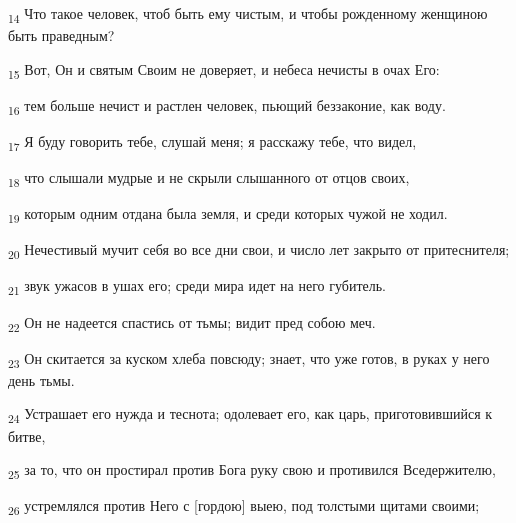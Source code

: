 \begin{tcolorbox}
\textsubscript{14} Что такое человек, чтоб быть ему чистым, и чтобы рожденному женщиною быть праведным?
\end{tcolorbox}
\begin{tcolorbox}
\textsubscript{15} Вот, Он и святым Своим не доверяет, и небеса нечисты в очах Его:
\end{tcolorbox}
\begin{tcolorbox}
\textsubscript{16} тем больше нечист и растлен человек, пьющий беззаконие, как воду.
\end{tcolorbox}
\begin{tcolorbox}
\textsubscript{17} Я буду говорить тебе, слушай меня; я расскажу тебе, что видел,
\end{tcolorbox}
\begin{tcolorbox}
\textsubscript{18} что слышали мудрые и не скрыли слышанного от отцов своих,
\end{tcolorbox}
\begin{tcolorbox}
\textsubscript{19} которым одним отдана была земля, и среди которых чужой не ходил.
\end{tcolorbox}
\begin{tcolorbox}
\textsubscript{20} Нечестивый мучит себя во все дни свои, и число лет закрыто от притеснителя;
\end{tcolorbox}
\begin{tcolorbox}
\textsubscript{21} звук ужасов в ушах его; среди мира идет на него губитель.
\end{tcolorbox}
\begin{tcolorbox}
\textsubscript{22} Он не надеется спастись от тьмы; видит пред собою меч.
\end{tcolorbox}
\begin{tcolorbox}
\textsubscript{23} Он скитается за куском хлеба повсюду; знает, что уже готов, в руках у него день тьмы.
\end{tcolorbox}
\begin{tcolorbox}
\textsubscript{24} Устрашает его нужда и теснота; одолевает его, как царь, приготовившийся к битве,
\end{tcolorbox}
\begin{tcolorbox}
\textsubscript{25} за то, что он простирал против Бога руку свою и противился Вседержителю,
\end{tcolorbox}
\begin{tcolorbox}
\textsubscript{26} устремлялся против Него с [гордою] выею, под толстыми щитами своими;
\end{tcolorbox}
